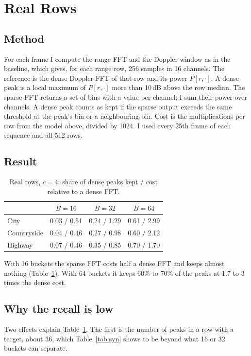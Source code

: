 \documentclass[10pt,a4paper]{article}
\begin{document}
\section{Real Rows}
\subsection{Method}
For each frame I compute the range FFT and the Doppler window as in the baseline, which gives, for each range row, 256 samples in 16 channels. The reference is the dense Doppler FFT of that row and its power $P[r, \cdot]$. A dense peak is a local maximum of $P[r, \cdot]$ more than 10\,dB above the row median. The sparse FFT returns a set of bins with a value per channel; I sum their power over channels. A dense peak counts as kept if the sparse output exceeds the same threshold at the peak's bin or a neighbouring bin. Cost is the multiplications per row from the model above, divided by 1024. I used every 25th frame of each sequence and all 512 rows.

\subsection{Result}
\begin{table}[h]
\caption{Real rows, $c = 4$: share of dense peaks kept / cost relative to a dense FFT.}
\label{tab:real}
\centering
\begin{tabular}{lccc}
\toprule
 & $B = 16$ & $B = 32$ & $B = 64$ \\
\midrule
City & 0.03 / 0.51 & 0.24 / 1.29 & 0.61 / 2.99 \\
Countryside & 0.04 / 0.46 & 0.27 / 0.98 & 0.60 / 2.12 \\
Highway & 0.07 / 0.46 & 0.35 / 0.85 & 0.70 / 1.70 \\
\bottomrule
\end{tabular}
\end{table}

With 16 buckets the sparse FFT costs half a dense FFT and keeps almost nothing (Table~\ref{tab:real}). With 64 buckets it keeps 60\% to 70\% of the peaks at 1.7 to 3 times the dense cost.

\subsection{Why the recall is low}
Two effects explain Table~\ref{tab:real}. The first is the number of peaks in a row with a target, about 36, which Table~\ref{tab:syn} shows to be beyond what 16 or 32 buckets can separate.
\end{document}
